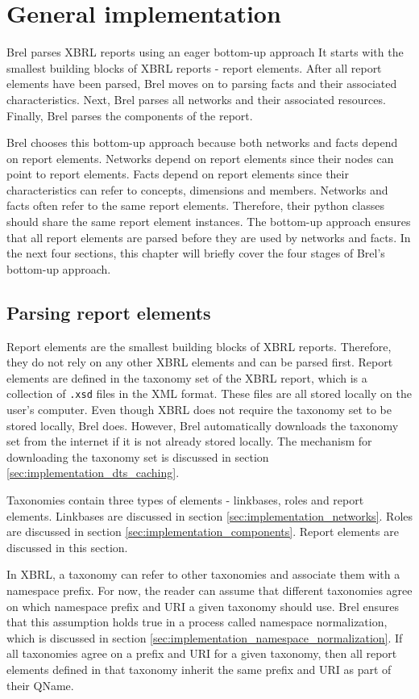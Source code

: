 \section{General implementation}

Brel parses XBRL reports using an eager bottom-up approach
It starts with the smallest building blocks of XBRL reports - report elements.
After all report elements have been parsed, Brel moves on to parsing facts and their associated characteristics.
Next, Brel parses all networks and their associated resources.
Finally, Brel parses the components of the report.

Brel chooses this bottom-up approach because both networks and facts depend on report elements.
Networks depend on report elements since their nodes can point to report elements.
Facts depend on report elements since their characteristics can refer to concepts, dimensions and members.
Networks and facts often refer to the same report elements.
Therefore, their python classes should share the same report element instances.
The bottom-up approach ensures that all report elements are parsed before they are used by networks and facts.
In the next four sections, this chapter will briefly cover the four stages of Brel's bottom-up approach.

\subsection{Parsing report elements}

Report elements are the smallest building blocks of XBRL reports.
Therefore, they do not rely on any other XBRL elements and can be parsed first.
Report elements are defined in the taxonomy set of the XBRL report, which is a collection of \texttt{.xsd} files in the XML format.
These files are all stored locally on the user's computer.
Even though XBRL does not require the taxonomy set to be stored locally, Brel does.
However, Brel automatically downloads the taxonomy set from the internet if it is not already stored locally.
The mechanism for downloading the taxonomy set is discussed in section \ref{sec:implementation_dts_caching}.

Taxonomies contain three types of elements - linkbases, roles and report elements.
Linkbases are discussed in section \ref{sec:implementation_networks}.
Roles are discussed in section \ref{sec:implementation_components}.
Report elements are discussed in this section.

In XBRL, a taxonomy can refer to other taxonomies and associate them with a namespace prefix.
For now, the reader can assume that different taxonomies agree on which namespace prefix and URI a given taxonomy should use.
Brel ensures that this assumption holds true in a process called namespace normalization, which is discussed in section \ref{sec:implementation_namespace_normalization}.
If all taxonomies agree on a prefix and URI for a given taxonomy, 
then all report elements defined in that taxonomy inherit the same prefix and URI as part of their QName.

